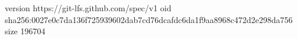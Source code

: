 version https://git-lfs.github.com/spec/v1
oid sha256:0027e0c7da136f725939602dab7cd76dcafdc6da1f9aa8968c472d2e298da756
size 196704
